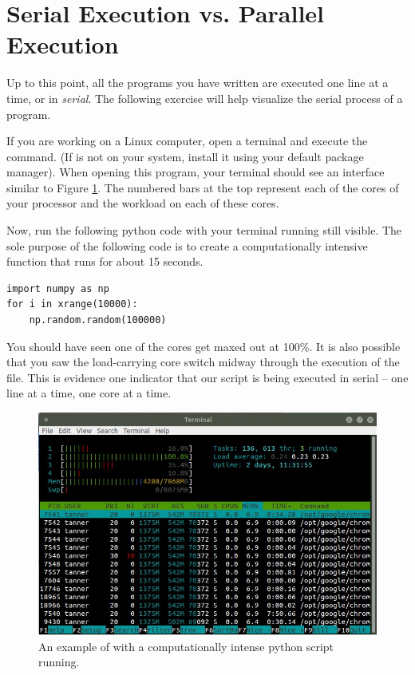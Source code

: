 \section*{Serial Execution vs. Parallel Execution}
Up to this point, all the programs you have written are executed one line at a time, or in \emph{serial}.
The following exercise will help visualize the serial process of a program.

\begin{problem}
If you are working on a Linux computer, open a terminal and execute the  command. (If  is not on your system, install it using your default package manager). When opening this program, your terminal should see an interface similar to Figure \ref{fig:htop}. The numbered bars at the top represent each of the cores of your processor and the workload on each of these cores.

Now, run the following python code with your terminal running  still visible. The sole purpose of the following code is to create a computationally intensive function that runs for about 15 seconds.

\begin{lstlisting}
import numpy as np
for i in xrange(10000):
    np.random.random(100000)
\end{lstlisting}

You should have seen one of the cores get maxed out at 100\%. It is also possible that you saw the load-carrying core switch midway through the execution of the file. This is evidence one indicator that our script is being executed in serial -- one line at a time, one core at a time.
\end{problem}

\begin{figure}[H]
    \includegraphics[width=\textwidth]{active.jpg}
\caption{An example of  with a computationally intense python script running.}
\label{fig:htop}
\end{figure}

